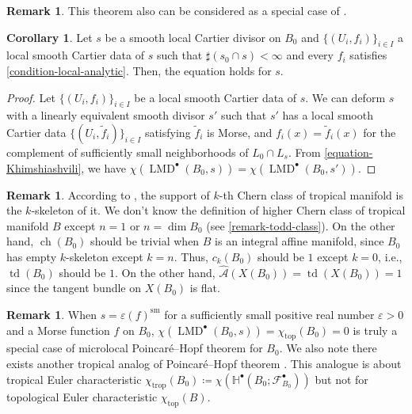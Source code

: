 \documentclass[a4paper,dvipdfmx,reqno,12pt]{amsart}
\theoremstyle{definition}
\newtheorem{corollary}[theorem]{Corollary}
\newtheorem{remark}[theorem]{Remark}
\newcommand{\deq}{\coloneqq}
\newcommand{\vep}{\varepsilon}%
\newcommand{\mb}[1]{\mathbb{#1}}%
\newcommand{\mcal}[1]{\mathcal{#1}}%
\newcommand{\opn}[1]{\operatorname{#1}}
\numberwithin{equation}{section}
\begin{document}
\begin{remark} \label{rmk: integral_mirror}
This theorem also can be considered as
a special case of \cite{MR4301560}.
\end{remark}

\begin{corollary}
Let $s$ be a smooth local Cartier divisor on $B_0$ and 
$\{(U_i,f_i)\}_{i\in I}$ a local smooth Cartier 
data of $s$ such that $\sharp (s_0\cap s)<\infty$ and
every $f_i$ satisfies \cref{condition-local-analytic}.
Then, the equation holds for $s$.
\end{corollary}

\begin{proof}
Let $\{(U_i,f_i)\}_{i\in I}$ be a local smooth Cartier
data of $s$. We can deform $s$ with a linearly equivalent
smooth divisor $s'$ 
such that $s'$ has a local smooth Cartier data 
$\{(U_i,\tilde{f}_i)\}_{i\in I}$ satisfying 
$\tilde{f}_i$ is Morse, and 
$f_i(x)=\tilde{f}_i(x)$ for the complement of 
sufficiently small neighborhoods of $L_0\cap L_s$. 
From \cref{equation-Khimshiashvili}, we have
$\chi(\opn{LMD}^{\bullet}(B_0,s))
=\chi(\opn{LMD}^{\bullet}(B_0,s'))$.
\end{proof}



\begin{remark}

According to \cite[5.3]{mikhalkinTropicalGeometryIts2006},
the support of $k$-th Chern class of tropical manifold is 
the $k$-skeleton of it.
We don't know the definition of higher Chern class of tropical manifold $B$ except
$n=1$ or $n=\dim B_0$ (see \cref{remark-todd-class}).
On the other hand, $\opn{ch}(B_0)$ should be trivial when $B$ is
an integral affine manifold, since $B_0$ has empty
$k$-skeleton except $k=n$.
Thus, $c_{k}(B_0)$ should be $1$ except $k=0$, 
i.e., $\opn{td}(B_0)$ should be $1$. 
On the other hand,
 $\hat{\mcal{A}}(X(B_0))=\opn{td}(X(B_0))=1$
since the tangent bundle on $X(B_0)$ is flat.
\end{remark}

\begin{remark}
When $s=\vep (f)^{\opn{sm}}$ for a sufficiently small
positive real number $\vep >0$ and 
a Morse function $f$ on $B_0$, 
$\chi(\opn{LMD}^{\bullet}(B_0,s))=
\chi_{\opn{top}}(B_0)=0$ is 
truly a special case of microlocal Poincar\'e--Hopf theorem for $B_0$.
We also note there exists another tropical analog of Poincar\'e--Hopf theorem
  \cite{rau2020tropical}. This analogue is about tropical Euler characteristic
$\chi_{\opn{trop}}(B_0)\deq 
\chi(\mb{H}^{\bullet}(B_0;\mcal{F}_{B_0}^{\bullet}))$
  but not for topological Euler characteristic $\chi_{\opn{top}}(B)$.
\end{remark}
\end{document}
